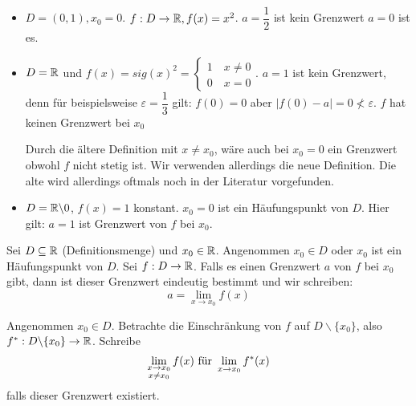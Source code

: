 \documentclass[main.tex]{subfiles}
\begin{document}
\begin{Beispiel}
  \begin{itemize}
    \item $D = (0,1), x_0 = 0$. $f: D\to\mathbb{R}, f(x) = x^2$. $a = \dfrac{1}{2}$ ist kein Grenzwert $a = 0$ ist es.
    \item $D = \mathbb{R}$ und $f(x) = sig(x)^2 = \left\{\begin{array}{c}
      1 \quad x \neq 0\\
      0 \quad x = 0
      \end{array}\right.$. $a = 1$ ist kein Grenzwert, denn für beispielsweise $\varepsilon = \dfrac{1}{3}$ gilt: $f(0) = 0$ aber $|f(0)-a| = 0 \not< \varepsilon$. $f$ hat keinen Grenzwert bei $x_0$
      \begin{Bemerkung}
         Durch die ältere Definition mit $x \neq x_0$, wäre auch bei $x_0 = 0$ ein Grenzwert obwohl $f$ nicht stetig ist. Wir verwenden allerdings die neue Definition. Die alte wird allerdings oftmals noch in der Literatur vorgefunden.
      \end{Bemerkung}
    \item $D = \mathbb{R} \backslash 0$, $f(x) = 1$ konstant. $x_0 = 0$ ist ein Häufungspunkt von $D$. Hier gilt: $a = 1$ ist Grenzwert von $f$ bei $x_0$.
  \end{itemize}
\end{Beispiel}

\begin{Bemerkung}
  Sei $D \subseteq \mathbb{R}$ (Definitionsmenge) und $x_0 \in \mathbb{R}$. Angenommen $x_0 \in D$ oder $x_0$ ist ein Häufungspunkt von $D$. Sei $f:D\to \mathbb{R}$. Falls es einen Grenzwert $a$ von $f$ bei $x_0$ gibt, dann ist dieser Grenzwert eindeutig bestimmt und wir schreiben:
  $$a = \lim \limits_{x \to x_0} f(x)$$
\end{Bemerkung}

\begin{Bemerkung}[Variante]
  Angenommen $x_0 \in D$. Betrachte die Einschränkung von $f$ auf $D \backslash \{x_0\}$, also $f^*:D\backslash\{x_0\} \to \mathbb{R}$. Schreibe
  $$\lim \limits_{\substack{x \to x_0 \\ x \neq x_0}} f(x) \text{ für } \lim \limits_{x \to x_0} f^*(x)$$
  falls dieser Grenzwert existiert.
\end{Bemerkung}
\end{document}

